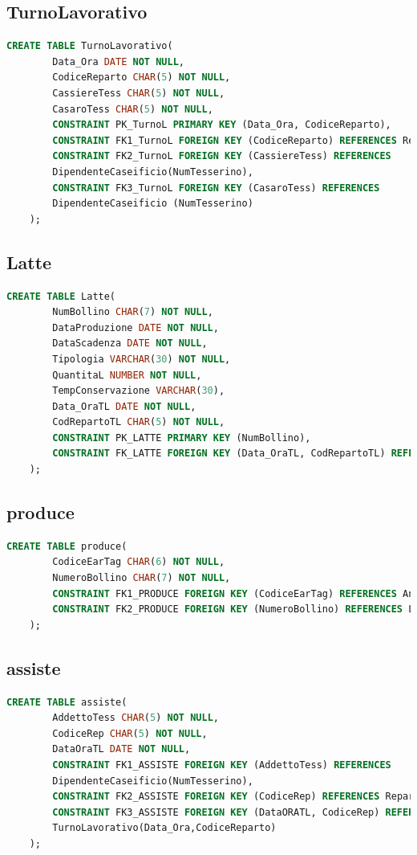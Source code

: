 \documentclass[12pt]{report}
\begin{document}
\subsection*{TurnoLavorativo}
\begin{lstlisting}[language=SQL]
    CREATE TABLE TurnoLavorativo(
        Data_Ora DATE NOT NULL,
        CodiceReparto CHAR(5) NOT NULL,
        CassiereTess CHAR(5) NOT NULL,
        CasaroTess CHAR(5) NOT NULL,
        CONSTRAINT PK_TurnoL PRIMARY KEY (Data_Ora, CodiceReparto),
        CONSTRAINT FK1_TurnoL FOREIGN KEY (CodiceReparto) REFERENCES Reparto(CodR),
        CONSTRAINT FK2_TurnoL FOREIGN KEY (CassiereTess) REFERENCES 
        DipendenteCaseificio(NumTesserino),
        CONSTRAINT FK3_TurnoL FOREIGN KEY (CasaroTess) REFERENCES 
        DipendenteCaseificio (NumTesserino)
    );
\end{lstlisting}

\subsection*{Latte}\begin{lstlisting}[language=SQL]
    CREATE TABLE Latte(
        NumBollino CHAR(7) NOT NULL,
        DataProduzione DATE NOT NULL,
        DataScadenza DATE NOT NULL,
        Tipologia VARCHAR(30) NOT NULL,
        QuantitaL NUMBER NOT NULL,
        TempConservazione VARCHAR(30),
        Data_OraTL DATE NOT NULL,
        CodRepartoTL CHAR(5) NOT NULL,
        CONSTRAINT PK_LATTE PRIMARY KEY (NumBollino),
        CONSTRAINT FK_LATTE FOREIGN KEY (Data_OraTL, CodRepartoTL) REFERENCES TurnoLavorativo(Data_Ora, CodiceReparto)
    );
\end{lstlisting}

\subsection*{produce}\begin{lstlisting}[language=SQL]
   CREATE TABLE produce(
        CodiceEarTag CHAR(6) NOT NULL,
        NumeroBollino CHAR(7) NOT NULL,
        CONSTRAINT FK1_PRODUCE FOREIGN KEY (CodiceEarTag) REFERENCES Animale (EarTag),
        CONSTRAINT FK2_PRODUCE FOREIGN KEY (NumeroBollino) REFERENCES Latte (NumBollino)
    );
\end{lstlisting}

\subsection*{assiste}
\begin{lstlisting}[language=SQL]
    CREATE TABLE assiste(
        AddettoTess CHAR(5) NOT NULL,
        CodiceRep CHAR(5) NOT NULL,
        DataOraTL DATE NOT NULL,
        CONSTRAINT FK1_ASSISTE FOREIGN KEY (AddettoTess) REFERENCES 
        DipendenteCaseificio(NumTesserino),
        CONSTRAINT FK2_ASSISTE FOREIGN KEY (CodiceRep) REFERENCES Reparto(CodR),
        CONSTRAINT FK3_ASSISTE FOREIGN KEY (DataORATL, CodiceRep) REFERENCES 
        TurnoLavorativo(Data_Ora,CodiceReparto)
    );
\end{lstlisting}
\end{document}
